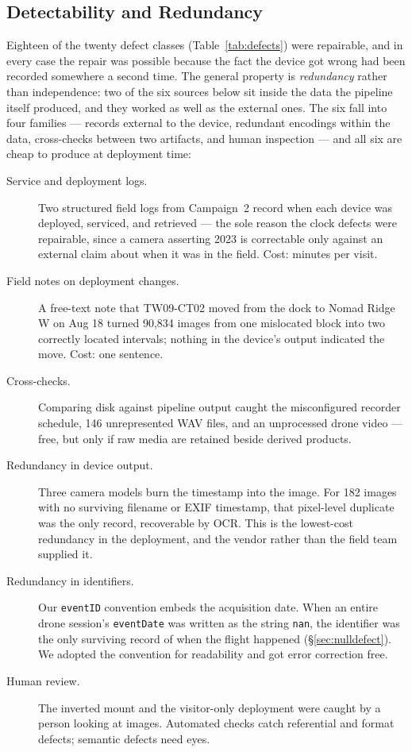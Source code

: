 \documentclass[sigconf]{acmart}
\begin{document}
\subsection{Detectability and Redundancy}
\label{sec:redundancy}

Eighteen of the twenty defect classes (Table~\ref{tab:defects}) were
repairable, and in every case the repair was possible because the fact
the device got wrong had been recorded somewhere a second time. The
general property is \emph{redundancy} rather than independence: two of
the six sources below sit inside the data the pipeline itself produced,
and they worked as well as the external ones. The six fall into four
families --- records external to the device, redundant encodings within
the data, cross-checks between two artifacts, and human inspection ---
and all six are cheap to produce at deployment time:

\begin{description}
\item[Service and deployment logs.] Two structured field logs from
Campaign~2 record when each device was deployed, serviced, and
retrieved --- the sole reason the clock defects were repairable, since a
camera asserting 2023 is correctable only against an external claim
about when it was in the field. Cost: minutes per visit.

\item[Field notes on deployment changes.] A free-text note that
TW09-CT02 moved from the dock to Nomad Ridge W on Aug 18 turned
90{,}834 images from one mislocated block into two correctly located
intervals; nothing in the device's output indicated the move. Cost: one
sentence.

\item[Cross-checks.] Comparing disk against pipeline output caught the
misconfigured recorder schedule, 146 unrepresented WAV files, and an
unprocessed drone video --- free, but only if raw media are retained
beside derived products.

\item[Redundancy in device output.] Three camera models burn the
timestamp into the image. For 182 images with no surviving filename or
EXIF timestamp, that pixel-level duplicate was the only record,
recoverable by OCR. This is the lowest-cost redundancy in the
deployment, and the vendor rather than the field team supplied it.

\item[Redundancy in identifiers.] Our \texttt{eventID}
convention embeds the acquisition date. When an entire drone session's
\texttt{eventDate} was written as the string \texttt{nan}, the
identifier was the only surviving record of when the flight happened
(\S\ref{sec:nulldefect}). We adopted the convention for readability and
got error correction free.

\item[Human review.] The inverted mount and the visitor-only deployment
were caught by a person looking at images. Automated checks catch
referential and format defects; semantic defects need eyes.
\end{description}
\end{document}
